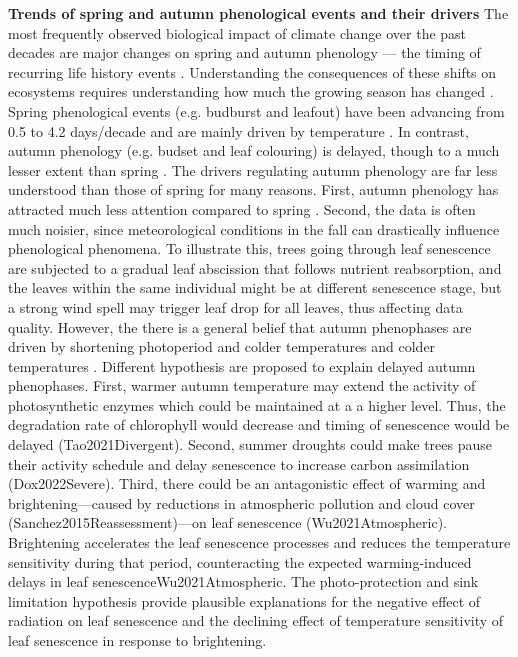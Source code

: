 \documentclass{article}
\begin{document}
\textbf{Trends of spring and autumn phenological events and their drivers}
The most frequently observed biological impact of climate change over the past decades are major changes on spring and autumn phenology --- the timing of recurring life history events \cite{parmesan_globally_2003,cleland_shifting_2007,lieth_phenology_1974,woolway_phenological_2021,menzel_european_2006}. Understanding the consequences of these shifts on ecosystems requires understanding how much the growing season has changed \cite{duputie_phenological_2015}. Spring phenological events (e.g. budburst and leafout) have been advancing from 0.5 \cite{wolfe_climate_2005} to 4.2 days/decade \cite{chmielewski_response_2001,fu_recent_2014} and are mainly driven by temperature \cite{chuine_why_2010,cleland_shifting_2007,penuelas_responses_2001}. In contrast, autumn phenology (e.g. budset and leaf colouring) is delayed, though to a much lesser extent than spring \cite{gallinat_autumn_2015,jeong_macroscale_2014}. The drivers regulating autumn phenology are far less understood than those of spring for many reasons. First, autumn phenology has attracted much less attention compared to spring \cite{piao_plant_2019}. Second, the data is often much noisier, since meteorological conditions in the fall can drastically influence phenological phenomena. To illustrate this, trees going through leaf senescence are subjected to a gradual leaf abscission that follows nutrient reabsorption, and the leaves within the same individual might be at different senescence stage, but a strong wind spell may trigger leaf drop for all leaves, thus affecting data quality. However, the there is a general belief that autumn phenophases are driven by shortening photoperiod and colder temperatures \cite{cooke_dynamic_2012,flynn_temperature_2018,korner_phenology_2010} and colder temperatures \cite{cooke_dynamic_2012,delpierre_temperate_2016}. Different hypothesis are proposed to explain delayed autumn phenophases. First, warmer autumn temperature may extend the activity of photosynthetic enzymes which could be maintained at a a higher level. Thus, the degradation rate of chlorophyll would decrease and timing of senescence would be delayed (Tao2021Divergent). Second, summer droughts could make trees pause their activity schedule and delay senescence to increase carbon assimilation (Dox2022Severe). Third, there could be an antagonistic effect of warming and brightening---caused by reductions in atmospheric pollution and cloud cover (Sanchez2015Reassessment)---on leaf senescence (Wu2021Atmospheric). Brightening accelerates the leaf senescence processes and reduces the temperature sensitivity during that period, counteracting the expected warming-induced delays in leaf senescenceWu2021Atmospheric. The photo-protection and sink limitation hypothesis provide plausible explanations for the negative effect of radiation on leaf senescence and the declining effect of temperature sensitivity of leaf senescence in response to brightening. \\
\end{document}
